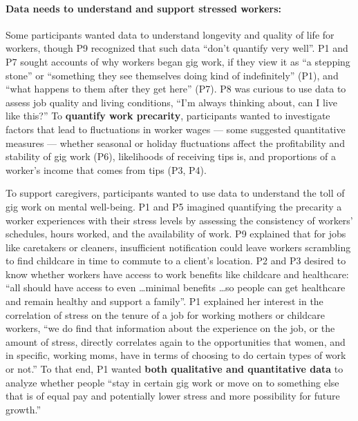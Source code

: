 \paragraph{Data needs to understand and support {stressed workers}:}  

Some participants wanted data to understand longevity and quality of life for workers, though P9 recognized {that such data} ``don't quantify very well''. P1 and P7 {sought} accounts of why workers began gig work, if they view it as ``a stepping stone'' or ``something they see themselves doing kind of indefinitely'' (P1), and ``what happens to them after they get here'' (P7). P8 was curious to use data to assess job quality and living conditions, ``I'm always thinking about, can I live like this?''
To \textbf{quantify work precarity}, participants wanted to investigate {factors that} lead to fluctuations in worker wages {--- some} suggested quantitative measures  --- whether seasonal or holiday fluctuations affect the profitability and stability of gig work (P6), {likelihoods} of receiving tips is, and {proportions} of a worker's income {that} comes from tips (P3, P4). 

To support caregivers, participants wanted to use data to understand the toll of gig work on mental well-being. P1 and P5 {imagined quantifying} the precarity a worker experiences with their stress levels by assessing the consistency of workers' schedules, hours worked, and {the availability of} work. P9 explained that for jobs like caretakers or cleaners, insufficient notification could leave workers scrambling to find childcare in time to commute to a client's location. P2 and P3 {desired to know} whether workers have access to work benefits like childcare and health{care}: %
``all should have access to even \dots minimal benefits \dots so people can get healthcare and remain healthy and support a family''. P1 {explained her interest} in the correlation of stress on the tenure of a job for working mothers or childcare workers, ``we do find that information about the experience on the job, or the amount of stress, directly correlates again to the opportunities that women, and in specific, working moms, have in terms of choosing to do certain types of work or not.'' To that end, P1 wanted \textbf{both qualitative and quantitative data} to analyze whether people ``stay in certain gig work or move on to something else that is of equal pay and potentially lower stress and more possibility for future growth.''

